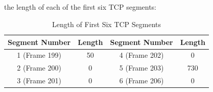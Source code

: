 \documentclass{article}
\begin{document}
\begin{CJK*}{UTF8}{gbsn}
\subsection{}
the length of each of the first six TCP segments:
\begin{table}[H]
    \centering
    \begin{tabular}{cccc}
        \toprule
        \textbf{Segment Number} & 
        \textbf{Length} & 
        \textbf{Segment Number} & 
        \textbf{Length} \\
        \midrule
        1 (Frame 199) & 50 & 4 (Frame 202) & 0 \\
        2 (Frame 200) & 0 & 5 (Frame 203) & 730 \\
        3 (Frame 201) & 0 & 6 (Frame 206) & 0 \\
        \bottomrule
    \end{tabular}
    \caption{Length of First Six TCP Segments}
    \label{tab:length_values}
\end{table}


\end{CJK*}
\end{document}
